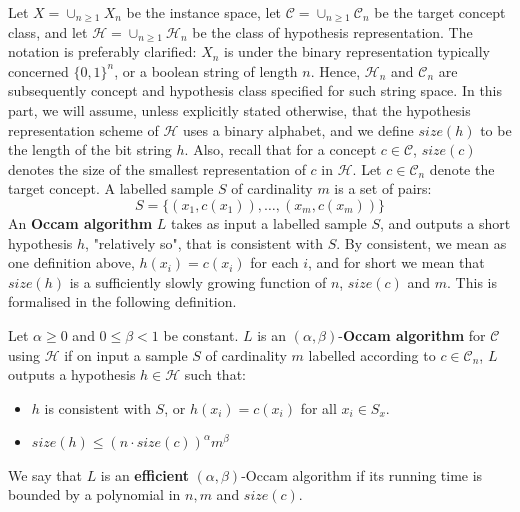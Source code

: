 Let $X= \cup_{n\geq 1} X_n$ be the instance space, let $\mathcal{C}=\cup_{n\geq 1}\mathcal{C}_{n}$ be the target concept class, and let $\mathcal{H}= \cup_{n\geq 1}\mathcal{H}_{n}$ be the class of hypothesis representation. The notation is preferably clarified: $X_{n}$ is under the binary representation typically concerned $\{0,1\}^{n}$, or a boolean string of length $n$. Hence, $\mathcal{H}_{n}$ and $\mathcal{C}_{n}$ are subsequently concept and hypothesis class specified for such string space. In this part, we will assume, unless explicitly stated otherwise, that the hypothesis representation scheme of $\mathcal{H}$ uses a binary alphabet, and we define $size(h)$ to be the length of the bit string $h$. Also, recall that for a concept $c\in \mathcal{C}$, $size(c)$ denotes the size of the smallest representation of $c$ in $\mathcal{H}$. Let $c\in \mathcal{C}_{n}$ denote the target concept. A labelled sample $S$ of cardinality $m$ is a set of pairs: 
\begin{equation*}
    S = \{(x_1, c(x_1)),\dots,(x_m, c(x_m))\}
\end{equation*}
An \textbf{Occam algorithm} $L$ takes as input a labelled sample $S$, and outputs a short hypothesis $h$, "relatively so", that is consistent with $S$. By consistent, we mean as one definition above, $h(x_{i})= c(x_{i})$ for each $i$, and for short we mean that $size(h)$ is a sufficiently slowly growing function of $n$, $size(c)$ and $m$. This is formalised in the following definition. 

\begin{definition}
    Let $\alpha \geq 0$ and $0\leq \beta < 1$ be constant. $L$ is an $(\alpha, \beta)$-\textbf{Occam algorithm} for $\mathcal{C}$ using $\mathcal{H}$ if on input a sample $S$ of cardinality $m$ labelled according to $c\in \mathcal{C}_{n}$, $L$ outputs a hypothesis $h\in \mathcal{H}$ such that: 
    \begin{itemize}
        \item $h$ is consistent with $S$, or $h(x_{i})=c(x_i)$ for all $x_{i}\in S_{x}$. 
        \item $size(h)\leq (n\cdot size(c))^{\alpha}m^{\beta}$
    \end{itemize}
    We say that $L$ is an \textbf{efficient} $(\alpha,\beta)$-Occam algorithm if its running time is bounded by a polynomial in $n,m$ and $size(c)$.  
\end{definition}

